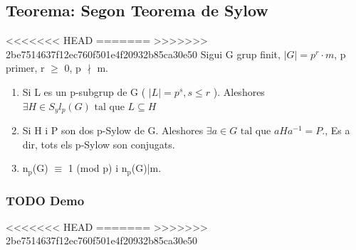 \documentclass[11pt]{article}
\begin{document}
\subsection{Teorema: Segon Teorema de Sylow}
<<<<<<< HEAD
\label{sec:orgf804f6b}
=======
\label{sec:org10b17dc}
>>>>>>> 2be7514637f12ec760f501e4f20932b85ca30e50
Sigui G grup finit, \(\lvert G \rvert = p^r \cdot m\), p primer, r \(\ge\) 0, p \(\nmid\) m.\\

\begin{enumerate}
\item Si L es un p-subgrup de G ( \(\lvert L \rvert = p^s, s \leq r\) ). Aleshores \(\exists H \in S_{y}l_{p}(G) \text{ tal que } L \subseteq H\)
\item Si H i P son dos p-Sylow de G. Aleshores \(\exists a \in G \text{ tal que } aHa^{-1} = P.\), Es a dir, tots els p-Sylow son conjugats.
\item n\(_{\text{p}}\)(G) \(\equiv\) 1 (mod p) i n\(_{\text{p}}\)(G)|m.
\end{enumerate}


\subsubsection{{\bfseries\sffamily TODO} Demo}
<<<<<<< HEAD
\label{sec:orgbd22aaa}
=======
\label{sec:orge63f1e2}
>>>>>>> 2be7514637f12ec760f501e4f20932b85ca30e50
\end{document}

